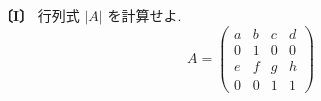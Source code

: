 \noindent\textbf{〔I〕}
行列式 $|A|$ を計算せよ.
\[
A=\begin{pmatrix}
a & b & c & d\\
0 & 1 & 0 & 0\\
e & f & g & h\\
0 & 0 & 1 & 1
\end{pmatrix}
\]
